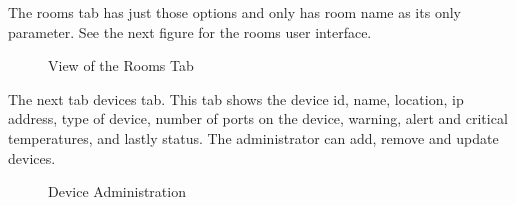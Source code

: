 \documentclass{report}
\begin{document}
\indent
The rooms tab has just those options and only has room name as its only parameter. See the next figure for the rooms user interface.
\begin{figure}[H]
	\caption{View of the Rooms Tab}
\end{figure}
\newpage

\indent
The next tab devices tab. This tab shows the device id, name, location, ip address, type of device, number of ports on the device, warning, alert and critical temperatures, and lastly status. The administrator can add, remove and update devices. 
\begin{figure}[H]
	\caption{Device Administration}
\end{figure}
\newpage
\end{document}
